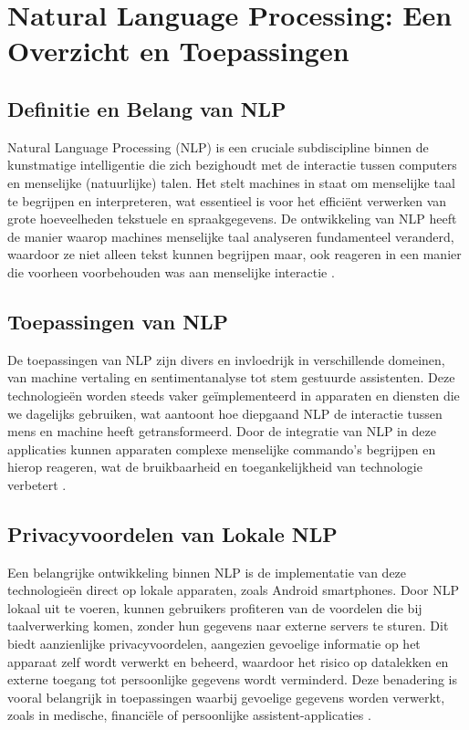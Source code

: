 \section{Natural Language Processing: Een Overzicht en Toepassingen}

\subsection{Definitie en Belang van NLP}

Natural Language Processing (NLP) is een cruciale subdiscipline binnen de kunstmatige intelligentie die zich bezighoudt met de interactie tussen computers en menselijke (natuurlijke) talen. Het stelt machines in staat om menselijke taal te begrijpen en interpreteren, wat essentieel is voor het efficiënt verwerken van grote hoeveelheden tekstuele en spraakgegevens. De ontwikkeling van NLP heeft de manier waarop machines menselijke taal analyseren fundamenteel veranderd, w\-aar\-door ze niet alleen tekst kunnen begrijpen maar, ook reageren in een manier die voorheen voorbehouden was aan menselijke interactie \autocite{Sanadi2022}.

\subsection{Toepassingen van NLP}

De toepassingen van NLP zijn divers en invloedrijk in verschillende domeinen, van machine vertaling en sentimentanalyse tot stem gestuurde assistenten. Deze technologieën worden steeds vaker geïmplementeerd in apparaten en diensten die we dagelijks gebruiken, wat aantoont hoe diepgaand NLP de interactie tussen mens en machine heeft getransformeerd. Door de integratie van NLP in deze applicaties kunnen apparaten complexe menselijke commando's begrijpen en hierop reageren, wat de bruikbaarheid en toegankelijkheid van technologie verbetert \autocite{Feng2020}.

\subsection{Privacyvoordelen van Lokale NLP}

Een belangrijke ontwikkeling binnen NLP is de implementatie van deze technologieën direct op lokale apparaten, zoals Android smartphones. Door NLP lokaal uit te voeren, kunnen gebruikers profiteren van de voordelen die bij taalverwerking komen, zonder hun gegevens naar externe servers te sturen. Dit biedt aanzienlijke privacyvoordelen, aangezien gevoelige informatie op het apparaat zelf wordt verwerkt en beheerd, waardoor het risico op datalekken en externe toegang tot persoonlijke gegevens wordt verminderd. Deze benadering is vooral belangrijk in toepassingen waarbij gevoelige gegevens worden verwerkt, zoals in medische, financiële of persoonlijke assistent-applicaties \autocite{Locke2021Natural}.

